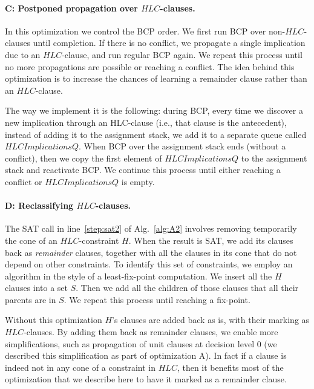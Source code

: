 \documentclass[twoside,11pt]{article}
\begin{document}
\paragraph{C: Postponed propagation over $HLC$-clauses.} In this optimization we control the BCP order. We first run BCP over non-$HLC$-clauses until completion. If there is no conflict, we propagate a single implication due to an $HLC$-clause, and run regular BCP again. We repeat this process until no more propagations are possible or reaching a conflict. The idea behind this optimization is to increase the chances of learning a remainder clause rather than an $HLC$-clause.

The way we implement it is the following: during BCP, every time we discover a new implication through an HLC-clause (i.e., that clause is the antecedent), instead of adding it to the assignment stack, we add it to a separate queue called $HLCImplicationsQ$. When BCP over the assignment stack ends (without a conflict), then we copy the first element of $HLCImplicationsQ$ to the assignment stack and reactivate BCP. We continue this process until either reaching a conflict or $HLCImplicationsQ$ is empty.

\paragraph{D: Reclassifying $HLC$-clauses.}
The SAT call in line~\ref{step:sat2} of Alg.~\ref{alg:A2}
involves removing temporarily the cone of an $HLC$-constraint $H$. When the result is SAT, we add its clauses back as \emph{remainder} clauses, together with all the clauses in its cone that do not depend on other
constraints. To identify this set of constraints, we employ an algorithm in
the style of a least-fix-point computation. We insert all the $H$ clauses
into a set $S$. Then we add all the children of those clauses that all their
parents are in $S$. We repeat this process until reaching a fix-point.

Without this optimization $H$'s clauses are added back as is, with their
marking as $HLC$-clauses. By adding them back as remainder clauses, we enable
more simplifications, such as propagation of unit clauses at decision level 0 (we described this simplification as part of optimization  A). In fact if a clause is indeed not in any cone of a constraint in $HLC$, then it benefits
most of the optimization that we describe here to have it marked as a remainder clause.
\end{document}
